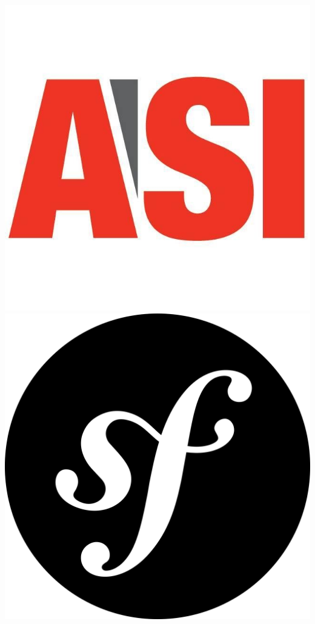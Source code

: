 \documentclass[dvipsnames,a2paper]{paper}
\begin{document}
\includegraphics[trim={0 3cm 0 0},clip,scale=0.25]{images/affiche/logoAsiNew.jpeg}
\hspace{1cm}
\includegraphics[scale=0.2]{./images/affiche/symfony2.png}
\end{document}
